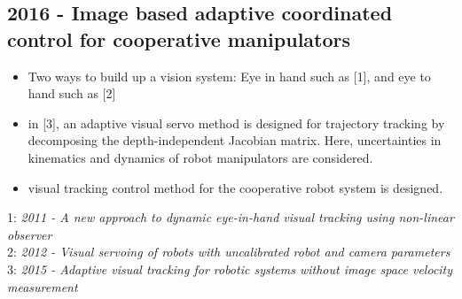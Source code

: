 \subsection{2016 - Image based adaptive coordinated control for cooperative manipulators}
\begin{itemize}
\item Two ways to build up a vision system: Eye in hand such as [1], and eye to hand such as [2]
\item in [3], an adaptive visual servo method is designed for trajectory tracking by decomposing the depth-independent Jacobian matrix. Here, uncertainties in kinematics and dynamics of robot manipulators are considered. 
\item visual tracking control method for the cooperative robot system is designed. 
\end{itemize}
1: \textit{2011 - A new approach to dynamic eye-in-hand visual tracking using non-linear observer} \\
2: \textit{2012 - Visual servoing of robots with uncalibrated robot and camera parameters} \\
3: \textit{2015 - Adaptive visual tracking for robotic systems without image space velocity measurement}

